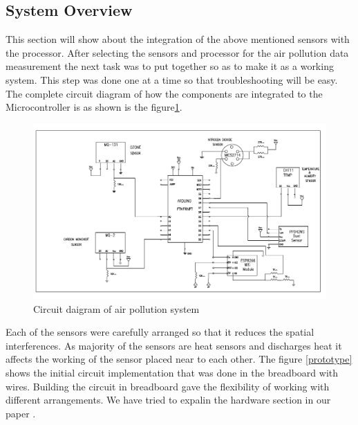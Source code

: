  \subsection{System Overview}

 This section will show about the integration of the above mentioned sensors with the processor. After selecting the sensors and processor for the air pollution data measurement the next task was to put together so as to make it as a working system. This step was done one at a time so that troubleshooting will be easy. The complete circuit diagram of how the components are integrated to the Microcontroller is as shown is the figure\ref{circuit}.
 \begin{figure}[h]
  \begin{center}
  \includegraphics[scale=0.80]{./images/figure5.png}
  \end{center}
  \caption{Circuit daigram of air pollution system}
  \label{circuit}
\end{figure}
 Each of the sensors were carefully arranged so that it reduces the spatial interferences. As majority of the sensors are heat sensors and discharges heat it affects the working of the sensor placed near to each other. The figure \ref{prototype} shows the initial circuit implementation that was done in the breadboard with wires. Building the circuit in breadboard gave the flexibility of working with different arrangements. We have tried to expalin the hardware section in our paper \cite{Saju2018}.


